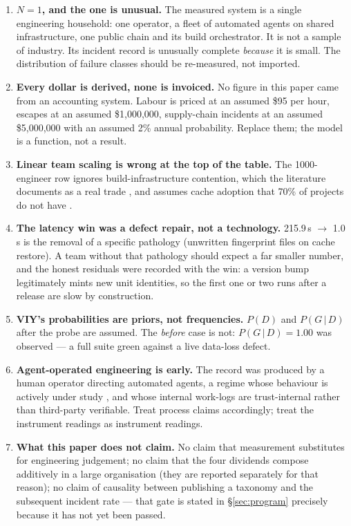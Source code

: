 \documentclass[11pt,a4paper]{article}
\providecommand{\textcite}[1]{\cite{#1}}
\begin{document}
\begin{enumerate}[leftmargin=1.5em,itemsep=3pt]
\item \textbf{$N=1$, and the one is unusual.} The measured system is a single engineering household: one operator, a fleet of automated agents on shared infrastructure, one public chain and its build orchestrator. It is not a sample of industry. Its incident record is unusually complete \emph{because} it is small. The distribution of failure classes should be re-measured, not imported.
\item \textbf{Every dollar is derived, none is invoiced.} No figure in this paper came from an accounting system. Labour is priced at an assumed \$95 per hour, escapes at an assumed \$1{,}000{,}000, supply-chain incidents at an assumed \$5{,}000{,}000 with an assumed 2\% annual probability. Replace them; the model is a function, not a result.
\item \textbf{Linear team scaling is wrong at the top of the table.} The 1000-engineer row ignores build-infrastructure contention, which the literature documents as a real trade \textcite{arxiv2510_20041}, and assumes cache adoption that 70\% of projects do not have \textcite{arxiv2601_19146}.
\item \textbf{The latency win was a defect repair, not a technology.} 215.9\,s $\to$ 1.0\,s is the removal of a specific pathology (unwritten fingerprint files on cache restore). A team without that pathology should expect a far smaller number, and the honest residuals were recorded with the win: a version bump legitimately mints new unit identities, so the first one or two runs after a release are slow by construction.
\item \textbf{VIY's probabilities are priors, not frequencies.} $P(D)$ and $P(G\,|\,D)$ after the probe are assumed. The \emph{before} case is not: $P(G\,|\,D)=1.00$ was observed --- a full suite green against a live data-loss defect.
\item \textbf{Agent-operated engineering is early.} The record was produced by a human operator directing automated agents, a regime whose behaviour is actively under study \textcite{arxiv2506_14683,arxiv2506_18824,arxiv2510_25694}, and whose internal work-logs are trust-internal rather than third-party verifiable. Treat process claims accordingly; treat the instrument readings as instrument readings.
\item \textbf{What this paper does not claim.} No claim that measurement substitutes for engineering judgement; no claim that the four dividends compose additively in a large organisation (they are reported separately for that reason); no claim of causality between publishing a taxonomy and the subsequent incident rate --- that gate is stated in \S\ref{sec:program} precisely because it has not yet been passed.
\end{enumerate}
\end{document}

